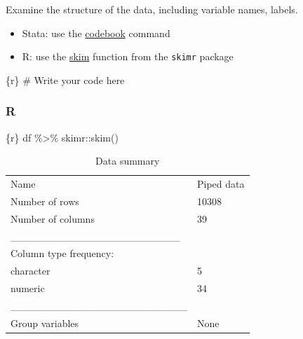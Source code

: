 \documentclass[
  letterpaper,
  DIV=11,
  numbers=noendperiod,
  oneside]{scrreprt}
\newenvironment{Shaded}{\begin{snugshade}}{\end{snugshade}}
\newcommand{\CommentTok}[1]{\textcolor[rgb]{0.37,0.37,0.37}{#1}}
\newcommand{\FunctionTok}[1]{\textcolor[rgb]{0.28,0.35,0.67}{#1}}
\newcommand{\InformationTok}[1]{\textcolor[rgb]{0.37,0.37,0.37}{#1}}
\newcommand{\NormalTok}[1]{\textcolor[rgb]{0.00,0.23,0.31}{#1}}
\newcommand{\SpecialCharTok}[1]{\textcolor[rgb]{0.37,0.37,0.37}{#1}}
\providecommand{\tightlist}{%
  \setlength{\itemsep}{0pt}\setlength{\parskip}{0pt}}\usepackage{longtable,booktabs,array}
\begin{document}
Examine the structure of the data, including variable names, labels.

\begin{tcolorbox}[enhanced jigsaw, coltitle=black, opacityback=0, title=\textcolor{quarto-callout-tip-color}{\faLightbulb}\hspace{0.5em}{Tip}, toprule=.15mm, bottomtitle=1mm, colbacktitle=quarto-callout-tip-color!10!white, colframe=quarto-callout-tip-color-frame, left=2mm, opacitybacktitle=0.6, bottomrule=.15mm, arc=.35mm, toptitle=1mm, colback=white, titlerule=0mm, breakable, leftrule=.75mm, rightrule=.15mm]

\begin{itemize}
\tightlist
\item
  Stata: use the
  \href{https://www.stata.com/manuals/dcodebook.pdf}{codebook} command
\item
  R: use the
  \href{https://docs.ropensci.org/skimr/reference/skim.html}{skim}
  function from the \texttt{skimr} package
\end{itemize}

\end{tcolorbox}

\begin{Shaded}
\begin{Highlighting}[]
\InformationTok{\textasciigrave{}\textasciigrave{}\textasciigrave{}\{r\}}
\CommentTok{\# Write your code here}
\InformationTok{\textasciigrave{}\textasciigrave{}\textasciigrave{}}
\end{Highlighting}
\end{Shaded}

\subsubsection{R}

\begin{Shaded}
\begin{Highlighting}[]
\InformationTok{\textasciigrave{}\textasciigrave{}\textasciigrave{}\{r\}}
\NormalTok{df }\SpecialCharTok{\%\textgreater{}\%}
\NormalTok{  skimr}\SpecialCharTok{::}\FunctionTok{skim}\NormalTok{()}
\InformationTok{\textasciigrave{}\textasciigrave{}\textasciigrave{}}
\end{Highlighting}
\end{Shaded}

\begin{longtable}[]{@{}ll@{}}
\caption{Data summary}\tabularnewline
\toprule\noalign{}
\endfirsthead
\endhead
\bottomrule\noalign{}
\endlastfoot
Name & Piped data \\
Number of rows & 10308 \\
Number of columns & 39 \\
\_\_\_\_\_\_\_\_\_\_\_\_\_\_\_\_\_\_\_\_\_\_\_ & \\
Column type frequency: & \\
character & 5 \\
numeric & 34 \\
\_\_\_\_\_\_\_\_\_\_\_\_\_\_\_\_\_\_\_\_\_\_\_\_ & \\
Group variables & None \\
\end{longtable}
\end{document}
